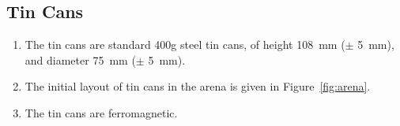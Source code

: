 \subsection{Tin Cans}
\label{spec:cans}

\begin{enumerate}
  \item The tin cans are standard 400g steel tin cans, of height \SI{108}{mm}
        ($\pm$ \SI{5}{mm}), and diameter \SI{75}{mm} ($\pm$ \SI{5}{mm}).
  \item The initial layout of tin cans in the arena is given in
        Figure~\ref{fig:arena}.
  \item The tin cans are ferromagnetic.
\end{enumerate}

